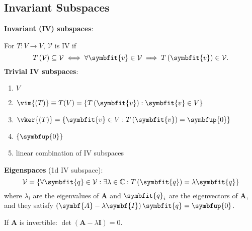 \documentclass{article}
\begin{document}
\begin{minipage}[t]{126.1962963mm}
\begin{multicols*}{2}
        \section*{Invariant Subspaces}
        \textbf{Invariant (IV) subspaces}:

        For \(T:V\rightarrow V\), \(\mathcal{V}\) is IV if
        \begin{equation*}
            T\left(\mathcal{V}\right)\subseteq \mathcal{V}\iff\forall \symbfit{v}
            \in \mathcal{V}\implies T\left(\symbfit{v}\right)\in \mathcal{V}.
        \end{equation*}
        \textbf{Trivial IV subspaces}:
        \begin{enumerate}
            \item \(V\)
            \item \(\vim{\left( T \right)} \equiv T(V) = \left\{ T\left(\symbfit{v}\right) : \symbfit{v}\in V \right\}\)
            \item \(\vker{\left( T \right)} = \left\{ \symbfit{v}\in V : T\left(\symbfit{v}\right) = \symbfup{0} \right\}\)
            \item \(\left\{ \symbfup{0} \right\}\)
            \item linear combination of IV subspaces
        \end{enumerate}
        \textbf{Eigenspaces} (1d IV subspace):
        \begin{equation*}
            \mathcal{V} = \left\{ \forall \symbfit{q}\in \mathcal{V}:\exists
            \lambda \in \mathbb{C}:T\left(\symbfit{q}\right) = \lambda \symbfit{q} \right\}
        \end{equation*}
        where \(\lambda_i\) are the eigenvalues of \(\symbf{A}\) and
        \(\symbfit{q}_i\) are the eigenvectors of \(\symbf{A}\), and they satisfy
        \(\left( \symbf{A} - \lambda \symbf{I} \right) \symbfit{q}=\symbfup{0}\).

        If \(\symbf{A}\) is invertible:
        \(\det{\left( \symbf{A} - \lambda\symbf{I} \right)} = 0\).


\end{multicols*}
\end{minipage}
\end{document}
